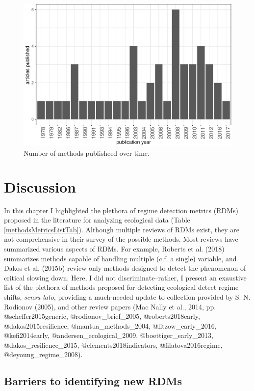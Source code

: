 \documentclass[12pt,twoside,openany]{reedthesis}
\begin{document}
\begin{figure}
\centering
\includegraphics{_myDissertation_files/figure-latex/jrnlYearFig-1.pdf}
\caption{\label{fig:jrnlYearFig}Number of methods publisheed over time.}
\end{figure}
\hypertarget{discussion}{%
\section{Discussion}\label{discussion}}

In this chapter I highlighted the plethora of regime detection metrics (RDMs) proposed in the literature for analyzing ecological data (Table \ref{methodsMetricsListTab}). Although multiple reviews of RDMs exist, they are not comprehensive in their survey of the possible methods. Most reviews have summarized various aspects of RDMs. For example, Roberts et al. (2018) summarizes methods capable of handling multiple (c.f. a single) variable, and Dakos et al. (2015b) review only methods designed to detect the phenomenon of critical slowing down. Here, I did not discriminate--rather, I present an exaustive list of the plethora of methods proposed for detecting ecological detect regime shifts, \emph{sensu lato}, providing a much-needed update to collection provided by S. N. Rodionov (2005), and other review papers (Mac Nally et al., 2014, pp. @scheffer2015generic, @rodionov\_brief\_2005, @roberts2018early, @dakos2015resilience, @mantua\_methods\_2004, @litzow\_early\_2016, @kefi2014early, @andersen\_ecological\_2009, @boettiger\_early\_2013, @dakos\_resilience\_2015, @clements2018indicators, @filatova2016regime, @deyoung\_regime\_2008).

\hypertarget{barriers-to-identifying-new-rdms}{%
\subsection{Barriers to identifying new RDMs}\label{barriers-to-identifying-new-rdms}}
\end{document}
